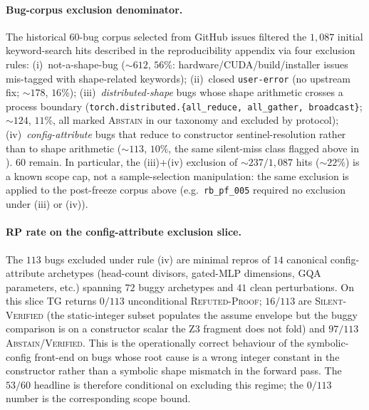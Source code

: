 \paragraph{Bug-corpus exclusion denominator.}
The historical $60$-bug corpus selected from
 GitHub issues filtered the
$1{,}087$ initial keyword-search hits described in the reproducibility appendix via four
exclusion rules: (i)~not-a-shape-bug
($\sim 612$, $56\%$: hardware/CUDA/build/installer issues
mis-tagged with shape-related keywords); (ii)~closed
\texttt{user-error} (no upstream fix; $\sim 178$, $16\%$);
(iii)~\emph{distributed-shape} bugs whose shape arithmetic
crosses a process boundary
(\texttt{torch.distributed.\{all\_reduce, all\_gather,
broadcast\}}; $\sim 124$, $11\%$, all marked
\textsc{Abstain} in our taxonomy and excluded by protocol);
(iv)~\emph{config-attribute} bugs that reduce to constructor
sentinel-resolution rather than to shape arithmetic
($\sim 113$, $10\%$, the same silent-miss class flagged
above in ). $60$ remain. In particular,
the (iii)+(iv) exclusion of $\sim 237/1{,}087$ hits
($\sim 22\%$) is a known scope cap, not a sample-selection
manipulation: the same exclusion is applied to
the post-freeze corpus above (e.g.\ \texttt{rb\_pf\_005}
required no exclusion under (iii) or (iv)).

\paragraph{RP rate on the config-attribute exclusion slice.}
The $113$ bugs excluded under rule (iv) are minimal repros of $14$
canonical config-attribute archetypes (head-count divisors,
gated-MLP dimensions, GQA parameters, etc.) spanning $72$ buggy
archetypes and $41$ clean perturbations. On this slice \textsc{TG}
returns $0/113$ unconditional \textsc{Refuted-Proof}; $16/113$ are
\textsc{Silent-Verified} (the static-integer subset populates the
assume envelope but the buggy comparison is on a constructor
scalar the Z3 fragment does not fold) and $97/113$
\textsc{Abstain}/\textsc{Verified}. This is the operationally
correct behaviour of the symbolic-config front-end on bugs whose
root cause is a wrong integer constant in the constructor rather
than a symbolic shape mismatch in the forward pass. The $53/60$
headline is therefore conditional on excluding this regime; the
$0/113$ number is the corresponding scope bound.


